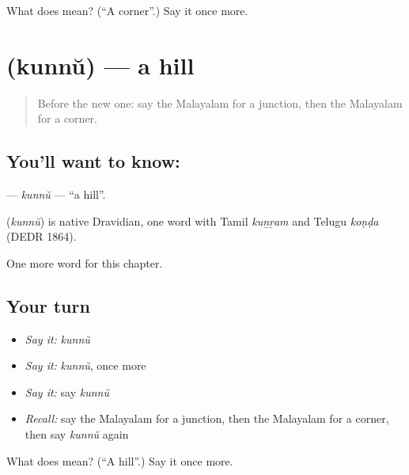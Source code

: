 \begin{tcolorbox}[breakable,colback=teal!4,colframe=teal!35!black,title={Before you move on}]
What does  mean? (\textquotedblleft{}A corner\textquotedblright{}.) Say it once more.
\end{tcolorbox}
\section[\texorpdfstring{\ml{കുന്ന്} (kunnŭ)}{കുന്ന് (kunnŭ)}]{ (kunnŭ) — a hill}

\label{lesson:ML-C239-kunnu}



\begin{quote}
Before the new one: say the Malayalam for a junction, then the Malayalam for a corner.
\end{quote}

\subsection*{You'll want to know: }
\textbf{} — \emph{kunnŭ} — \textquotedblleft{}a hill\textquotedblright{}.

\begin{cousinweb}
\textbf{} (\emph{kunnŭ}) is native Dravidian, one word with Tamil \emph{kuṉṟam} and Telugu \emph{koṇḍa} (DEDR 1864).
\end{cousinweb}

\begin{grammarlens}[title={What you've built}]
One more word for this chapter.
\end{grammarlens}

\subsection*{Your turn}
\begin{itemize}
\raggedright
  \item \emph{Say it:} \emph{kunnŭ}
  \item \emph{Say it:} \emph{kunnŭ}, once more
  \item \emph{Say it:} say \emph{kunnŭ}
  \item \emph{Recall:} say the Malayalam for a junction, then the Malayalam for a corner, then say \emph{kunnŭ} again
\end{itemize}

\begin{tcolorbox}[breakable,colback=teal!4,colframe=teal!35!black,title={Before you move on}]
What does  mean? (\textquotedblleft{}A hill\textquotedblright{}.) Say it once more.
\end{tcolorbox}
